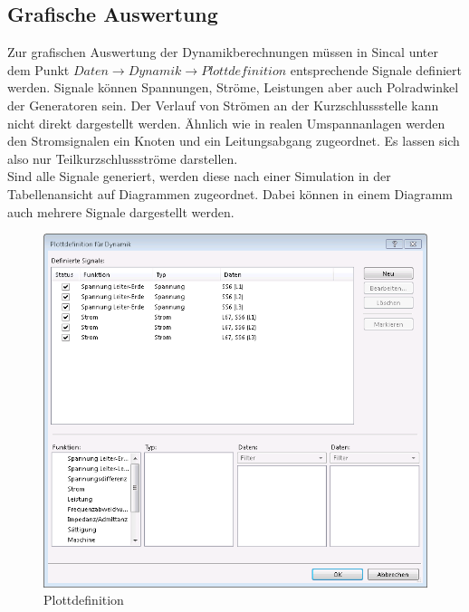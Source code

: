 \documentclass{scrartcl}
\begin{document}
\begin{onehalfspace}
\subsection{Grafische Auswertung}
Zur grafischen Auswertung der Dynamikberechnungen müssen in Sincal unter dem Punkt $Daten \rightarrow Dynamik \rightarrow Plottdefinition$ entsprechende Signale definiert werden. Signale können Spannungen, Ströme, Leistungen aber auch Polradwinkel der Generatoren sein. Der Verlauf von Strömen an der Kurzschlussstelle kann nicht direkt dargestellt werden. Ähnlich wie in realen Umspannanlagen werden den Stromsignalen ein Knoten und ein Leitungsabgang zugeordnet. Es lassen sich also nur Teilkurzschlussströme darstellen. \\
Sind alle Signale generiert, werden diese nach einer Simulation in der Tabellenansicht auf Diagrammen zugeordnet. Dabei können in einem Diagramm auch mehrere Signale dargestellt werden.

	\begin{figure}[H]
	\centering
	\includegraphics[scale=0.5]{img/plottdefinition.png}
	\caption{Plottdefinition}
	\end{figure}


\end{onehalfspace}
\end{document}
